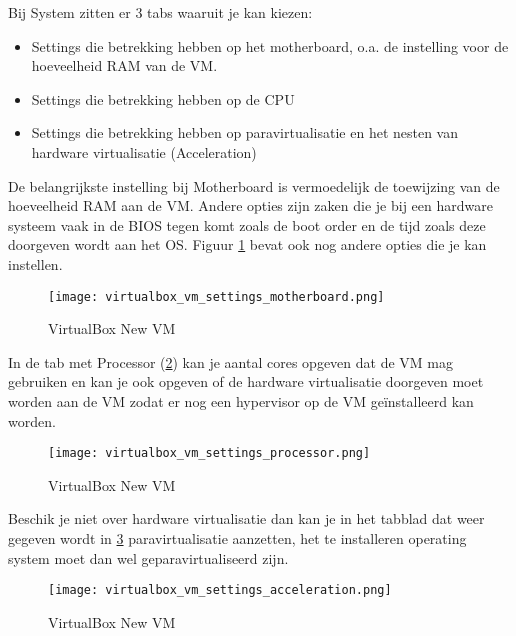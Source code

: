 Bij System zitten er 3 tabs waaruit je kan kiezen:
\begin{itemize}
	\item Settings die betrekking hebben op het motherboard, o.a. de instelling voor de hoeveelheid RAM van de VM.
	\item Settings die betrekking hebben op de CPU
	\item Settings die betrekking hebben op paravirtualisatie en het nesten van hardware virtualisatie (Acceleration)
\end{itemize}

De belangrijkste instelling bij Motherboard is vermoedelijk de toewijzing van de hoeveelheid RAM aan de VM. Andere opties zijn zaken die je bij een hardware systeem vaak in de BIOS tegen komt zoals de boot order en de tijd zoals deze doorgeven wordt aan het OS. Figuur \ref{VB_settings_system_mb} bevat ook nog andere opties die je kan instellen.
\begin{figure}[H]
	\centering
	\texttt{[image: virtualbox\_vm\_settings\_motherboard.png]}
	\caption{VirtualBox New VM}
	\label{VB_settings_system_mb}
\end{figure}

In de tab met Processor (\ref{VB_settings_system_cpu}) kan je aantal cores opgeven dat de VM mag gebruiken en kan je ook opgeven of de hardware virtualisatie doorgeven moet worden aan de VM zodat er nog een hypervisor op de VM ge\"installeerd kan worden.
\begin{figure}[H]
	\centering
	\texttt{[image: virtualbox\_vm\_settings\_processor.png]}
	\caption{VirtualBox New VM}
	\label{VB_settings_system_cpu}
\end{figure}

Beschik je niet over hardware virtualisatie dan kan je in het tabblad dat weer gegeven wordt in \ref{VB_settings_accel} paravirtualisatie aanzetten, het te installeren operating system moet dan wel geparavirtualiseerd zijn.

\begin{figure}[H]
	\centering
	\texttt{[image: virtualbox\_vm\_settings\_acceleration.png]}
	\caption{VirtualBox New VM}
	\label{VB_settings_accel}
\end{figure}

